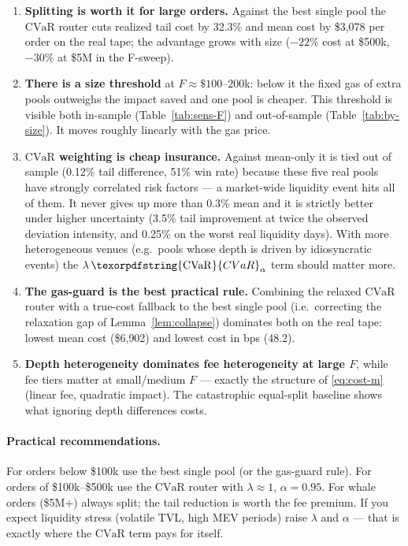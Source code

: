\documentclass[11pt,a4paper]{article}
\theoremstyle{remark}
\newcommand{\cvar}{\texorpdfstring{\ensuremath{\mathrm{CVaR}}}{CVaR}}
\begin{document}
\begin{enumerate}[leftmargin=2.2em]
  \item \textbf{Splitting is worth it for large orders.}  Against the best single pool the
        \cvar{} router cuts realized tail cost by 32.3\% and mean cost by \$3{,}078 per
        order on the real tape; the advantage grows with size ($-22\%$ cost at \$500k,
        $-30\%$ at \$5M in the F-sweep).
  \item \textbf{There is a size threshold} at $F\approx\$100$--$200$k: below it the fixed
        gas of extra pools outweighs the impact saved and one pool is cheaper.  This
        threshold is visible both in-sample (Table~\ref{tab:sens-F}) and out-of-sample
        (Table~\ref{tab:by-size}).  It moves roughly linearly with the gas price.
  \item \textbf{\cvar{} weighting is cheap insurance.}  Against mean-only it is tied out of
        sample (0.12\% tail difference, 51\% win rate) because these five real pools have
        strongly correlated risk factors --- a market-wide liquidity event hits all of them.
        It never gives up more than 0.3\% mean and it is strictly better under higher
        uncertainty (3.5\% tail improvement at twice the observed deviation intensity, and
        0.25\% on the worst real liquidity days).  With more heterogeneous venues
        (e.g.\ pools whose depth is driven by idiosyncratic events) the $\lambda\,\cvar_\alpha$
        term should matter more.
  \item \textbf{The gas-guard is the best practical rule.}  Combining the relaxed \cvar{}
        router with a true-cost fallback to the best single pool (i.e.\ correcting the
        relaxation gap of Lemma~\ref{lem:collapse}) dominates both on the real tape: lowest
        mean cost (\$6{,}902) and lowest cost in bps (48.2).
  \item \textbf{Depth heterogeneity dominates fee heterogeneity at large $F$}, while fee
        tiers matter at small/medium $F$ --- exactly the structure of
        \eqref{eq:cost-m} (linear fee, quadratic impact).  The catastrophic equal-split
        baseline shows what ignoring depth differences costs.
\end{enumerate}

\paragraph{Practical recommendations.}
For orders below \$100k use the best single pool (or the gas-guard rule).  For orders of
\$100k--\$500k use the \cvar{} router with $\lambda\approx1$, $\alpha=0.95$.  For whale
orders (\$5M+) always split; the tail reduction is worth the fee premium.  If you expect
liquidity stress (volatile TVL, high MEV periods) raise $\lambda$ and $\alpha$ --- that is
exactly where the \cvar{} term pays for itself.
\end{document}
